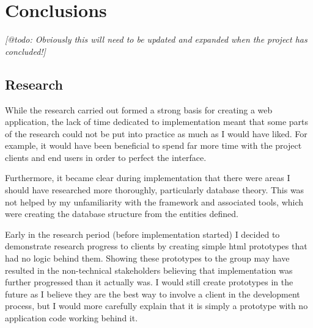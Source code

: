 
\section{Conclusions}
\label{sec:conclusions}

\emph{[@todo: Obviously this will need to be updated and expanded when the
project has concluded!]}



\subsection{Research}

While the research carried out formed a strong basis for creating a web
application, the lack of time dedicated to implementation meant that some
parts of the research could not be put into practice as much as I would have
liked. For example, it would have been beneficial to spend far more time with
the project clients and end users in order to perfect the interface.

Furthermore, it became clear during implementation that there were areas I
should have researched more thoroughly, particularly database theory. This was
not helped by my unfamiliarity with the framework and associated tools, which
were creating the database structure from the entities defined.

Early in the research period (before implementation started) I decided to
demonstrate research progress to clients by creating simple \gls{html}
prototypes that had no logic behind them. Showing these prototypes to the
group may have resulted in the non-technical stakeholders believing that
implementation was further progressed than it actually was. I would still
create prototypes in the future as I believe they are the best way to involve
a client in the development process, but I would more carefully explain that
it is simply a prototype with no application code working behind it.

